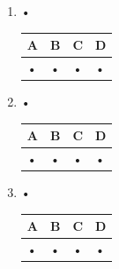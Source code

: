 \documentclass[oneside,12pt]{exam}          %
\begin{document}
\begin{enumerate}[label=\underline{Question \no\arabic*} :  , leftmargin=* , itemsep=1mm]
		

	\item •
	
		\hspace{\linewidth-\textwidth}
		\renewcommand{\arraystretch}{1.5}
		\begin{tabular}{| P{0.22\textwidth} | P{0.22\textwidth} | P{0.22\textwidth} | P{0.22\textwidth} |} \hline
			A & B & C & D \\ \hline
			• & • & • & • \\ \hline
		\end{tabular}
		
		

	\item •
	
		\hspace{\linewidth-\textwidth}
		\renewcommand{\arraystretch}{1.5}
		\begin{tabular}{| P{0.22\textwidth} | P{0.22\textwidth} | P{0.22\textwidth} | P{0.22\textwidth} |} \hline
			A & B & C & D \\ \hline
			• & • & • & • \\ \hline
		\end{tabular}
		
		

	\item •
	
		\hspace{\linewidth-\textwidth}
		\renewcommand{\arraystretch}{1.5}
		\begin{tabular}{| P{0.22\textwidth} | P{0.22\textwidth} | P{0.22\textwidth} | P{0.22\textwidth} |} \hline
			A & B & C & D \\ \hline
			• & • & • & • \\ \hline
		\end{tabular}
		
		
		
\newpage
\end{enumerate}
\end{document}
